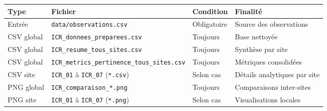 {\def\LTcaptype{none} %
\begin{longtable}[]{@{}
  >{\raggedright\arraybackslash}p{}
  >{\raggedright\arraybackslash}p{}
  >{\raggedright\arraybackslash}p{}
  >{\raggedright\arraybackslash}p{}@{}}
\toprule\noalign{}
\begin{minipage}[b]{\linewidth}\raggedright
Type
\end{minipage} & \begin{minipage}[b]{\linewidth}\raggedright
Fichier
\end{minipage} & \begin{minipage}[b]{\linewidth}\raggedright
Condition
\end{minipage} & \begin{minipage}[b]{\linewidth}\raggedright
Finalité
\end{minipage} \\
\midrule\noalign{}
\endhead
\bottomrule\noalign{}
\endlastfoot
Entrée & \texttt{data/observations.csv} & Obligatoire & Source des
observations \\
CSV global & \texttt{ICR\_donnees\_preparees.csv} & Toujours & Base
nettoyée \\
CSV global & \texttt{ICR\_resume\_tous\_sites.csv} & Toujours & Synthèse
par site \\
CSV global & \texttt{ICR\_metrics\_pertinence\_tous\_sites.csv} &
Toujours & Métriques consolidées \\
CSV site & \texttt{ICR\_01} à \texttt{ICR\_07} (\texttt{*.csv}) & Selon
cas & Détails analytiques par site \\
PNG global & \texttt{ICR\_comparaison\_*.png} & Toujours & Comparaisons
inter-sites \\
PNG site & \texttt{ICR\_01} à \texttt{ICR\_07} (\texttt{*.png}) & Selon
cas & Visualisations locales \\
\end{longtable}
}
